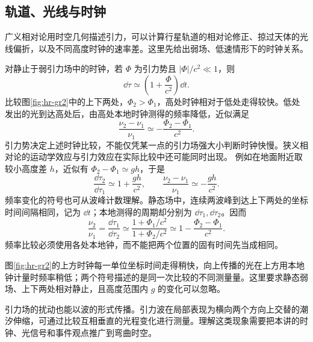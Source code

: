 \subsection{轨道、光线与时钟}

广义相对论用时空几何描述引力，可以计算行星轨道的相对论修正、掠过天体的光线偏折，以及不同高度时钟的速率差。这里先给出弱场、低速情形下的时钟关系。

对静止于弱引力场中的时钟，若 $\Phi$ 为引力势且 $|\Phi|/c^2\ll1$，则
\[
\dd\tau\simeq\left(1+\frac{\Phi}{c^2}\right)\dd t.
\]
比较图\ref{fig:hr-gr2}中的上下两处，$\Phi_2>\Phi_1$，高处时钟相对于低处走得较快。低处发出的光到达高处后，由高处本地时钟测得的频率降低，近似满足
\[
\frac{\nu_2-\nu_1}{\nu_1}\simeq-\frac{\Phi_2-\Phi_1}{c^2}.
\]
引力势决定上述时钟比较，不能仅凭某一点的引力场强大小判断时钟快慢。狭义相对论的运动学效应与引力效应在实际比较中还可能同时出现。
例如在地面附近取较小高度差 $h$，近似有 $\Phi_2-\Phi_1\simeq gh$，于是
\[
\frac{\dd\tau_2}{\dd\tau_1}\simeq1+\frac{gh}{c^2},\qquad
\frac{\nu_2-\nu_1}{\nu_1}\simeq-\frac{gh}{c^2}.
\]
频率变化的符号也可从波峰计数理解。静态场中，连续两波峰到达上下两处的坐标时间间隔相同，记为 $\dd t$；本地测得的周期却分别为 $\dd\tau_1,\dd\tau_2$。因而
\[
 \frac{\nu_2}{\nu_1}=\frac{\dd\tau_1}{\dd\tau_2}
 \simeq\frac{1+\Phi_1/c^2}{1+\Phi_2/c^2}
 \simeq1-\frac{\Phi_2-\Phi_1}{c^2}.
\]
频率比较必须使用各处本地钟，而不能把两个位置的固有时间先当成相同。

图\ref{fig:hr-gr2}的上方时钟每一单位坐标时间走得稍快，向上传播的光在上方用本地钟计量时频率稍低；两个符号描述的是同一次比较的不同测量量。这里要求静态弱场、上下两处相对静止，且高度范围内 $g$ 的变化可以忽略。

引力场的扰动也能以波的形式传播。引力波在局部表现为横向两个方向上交替的潮汐伸缩，可通过比较互相垂直的光程变化进行测量。理解这类现象需要把本讲的时钟、光信号和事件观点推广到弯曲时空。
